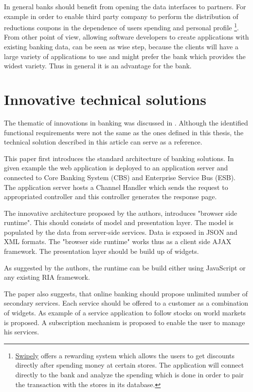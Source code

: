In general banks should benefit from opening the data interfaces to partners. For example in order to enable third party company to perform the distribution of  reductions coupons in the dependence of users spending and personal profile \footnote{\href{https://swipely.com/lp/unsupported}{Swipely} offers a rewarding system which allows the users to get discounts directly after spending money at certain stores. The application will connect directly to the bank and analyze the spending which is done in order to pair the transaction with the stores in its database.}. From other point of view, allowing software developers to create applications with existing banking data, can be seen as wise step, because the clients will have a large variety of applications to use and might prefer the bank which provides the widest variety. Thus in general it is an advantage for the bank.

\section{Innovative technical solutions}
The thematic of innovations in banking was discussed in \cite{IBM09}. Although the identified functional requirements were not the same as the ones defined in this thesis, the technical solution described in this article can serve as a reference.

This paper first introduces the standard architecture of banking solutions. In given example the web application is deployed to an application server and connected to Core Banking System (CBS) and Enterprise Service Bus (ESB). The application server hosts a Channel Handler which sends the request to appropriated controller and this controller generates the response page.

The innovative architecture proposed by the authors, introduces "browser side runtime". This should consists of model and presentation layer. The model is populated by the data from server-side services. Data is exposed in JSON and XML formats. The "browser side runtime" works thus as a client side AJAX framework. The presentation layer should be build up of widgets.

As suggested by the authors, the runtime can be build either using JavaScript or any existing RIA framework.

The paper also suggests, that online banking should propose unlimited number of secondary services. Each service should be offered to a customer as a combination of widgets. As example of a service application to follow stocks on world markets is proposed. A subscription mechanism is proposed to enable the user to manage his services.